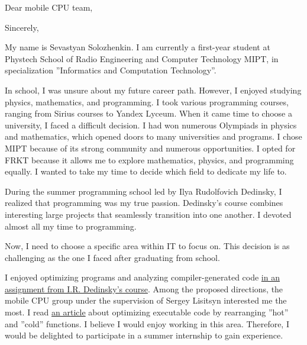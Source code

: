 \documentclass[11pt,a4paper,roman]{moderncv}
\date{}
\begin{document}
\opening{Dear mobile CPU team, }
\closing{Sincerely, }

\makelettertitle
\hspace{0.5cm}
My name is Sevastyan Solozhenkin. I am currently a first-year student at Phystech School of Radio Engineering and Computer Technology MIPT, in specialization ”Informatics and
Computation Technology”.

\hspace{0.5cm}
In school, I was unsure about my future career path. However, I enjoyed studying physics, mathematics, and programming. I took various programming courses, ranging from Sirius courses to Yandex Lyceum. When it came time to choose a university, I faced a difficult decision. I had won numerous Olympiads in physics and mathematics, which opened doors to many universities and programs. I chose MIPT because of its strong community and numerous opportunities. I opted for FRKT because it allows me to explore mathematics, physics, and programming equally. I wanted to take my time to decide which field to dedicate my life to.

\hspace{0.5cm}
During the summer programming school led by Ilya Rudolfovich Dedinsky, I realized that
programming was my true passion. Dedinsky’s course combines interesting large projects that seamlessly transition into one another. I devoted almost all my time to programming.

\hspace{0.5cm}
Now, I need to choose a specific area within IT to focus on. This decision is as challenging as the one I faced after graduating from school.

\hspace{0.5cm}
I enjoyed optimizing programs and analyzing compiler-generated code \href{https://github.com/sevaphasol/mandelbrot}{in an assignment
from I.R. Dedinsky’s course}. Among the proposed directions, the mobile CPU group under the supervision of Sergey Lisitsyn interested me the most. I read \href{https://cyberleninka.ru/article/n/sbor-profilnoy-informatsii-s-pomoschyu-trass-ispolneniya-prilozheniya-dlya-staticheskoy-optimiziruyuschey-binarnoy-translyatsii/viewer}{an article} about optimizing
executable code by rearranging ”hot” and ”cold” functions. I believe I would enjoy working in this area. Therefore, I would be delighted to participate in a summer internship to gain experience.

\makeletterclosing
\end{document}
